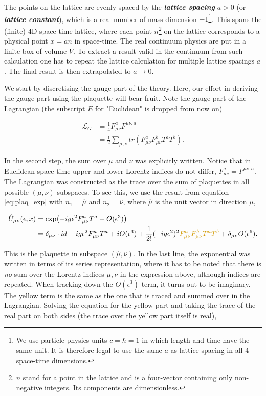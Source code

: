 \documentclass{article}
\theoremstyle{plain} %
\theoremstyle{convention} %
\theoremstyle{remark} %
\def\df#1{\textbf{\textit{#1}}}
\numberwithin{equation}{section}
\begin{document}
The points on the lattice are evenly spaced by the \df{lattice spacing} $a > 0$ (or \df{lattice constant}), which is a real number of mass dimension $-1$\footnote{We use particle physics units $c = \hbar = 1$ in which length and time have the same unit. It is therefore legal to use the same $a$ as lattice spacing in all $4$ space-time dimensions.}. This spans the (finite) 4D space-time lattice, where each point $n$\footnote{$n$ stand for a point in the lattice and is a four-vector containing only non-negative integers. Its components are dimensionless.} on the lattice corresponds to a physical point $x = an$ in space-time. The real continuum physics are put in a finite box of volume $V$. To extract a result valid in the continuum from such calculation one has to repeat the lattice calculation for multiple lattice spacings $a$. The final result is then extrapolated to $a \to 0$.

We start by discretising the gauge-part of the theory. Here, our effort in deriving the gauge-part using the plaquette will bear fruit. Note the gauge-part of the Lagrangian (the subscript $E$ for "Euclidean" is dropped from now on)

\begin{align*}
    \mathcal{L}_G &= \frac{1}{4} F_{\mu \nu}^a F^{\mu \nu, a} \\
    &= \frac{1}{2} \sum_{\mu, \nu} tr( F_{\mu \nu}^a F_{\mu \nu}^b T^a T^b).
\end{align*}

In the second step, the sum over $\mu$ and $\nu$ was explicitly written. Notice that in Euclidean space-time upper and lower Lorentz-indices do not differ, $F_{\mu \nu}^a = F^{\mu \nu, a}$. The Lagrangian was constructed as the trace over the sum of plaquettes in all possible $(\mu, \nu)$-subspaces. To see this, we use the result from equation \eqref{eq:plaq_exp} with $n_1 = \hat{\mu}$ and $n_2 = \hat{\nu}$, where $\hat{\mu}$ is the unit vector in direction $\mu$,

\begin{align*}
    \hat{U}_{\mu \nu}(\epsilon,x) &= \exp(-ig \epsilon^2 F_{\mu \nu}^a T^a + O(\epsilon^3) ) \\
    &= \delta_{\mu \nu} \cdot id -ig \epsilon^2 F_{\mu \nu}^a T^a + i O(\epsilon^3) + \frac{1}{2!}(-ig \epsilon^2)^2 \textcolor{cyellow}{F_{\mu \nu}^a F_{\mu \nu}^b T^a T^b } + \delta_{\mu \nu} O(\epsilon^6).
\end{align*}

This is the plaquette in subspace $(\hat{\mu}, \hat{\nu})$. In the last line, the exponential was written in terms of its series representation, where it has to be noted that there is \textit{no} sum over the Lorentz-indices $\mu,\nu$ in the expression above, although indices are repeated. When tracking down the $O(\epsilon^3)$-term, it turns out to be imaginary. The \textcolor{cyellow}{yellow} term is the same as the one that is traced and summed over in the Lagrangian. Solving the equation for the yellow part and taking the trace of the real part on both sides (the trace over the yellow part itself is real),
\end{document}
